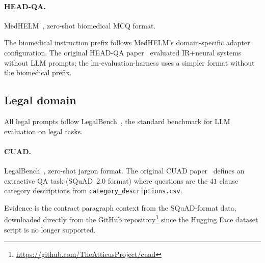 \paragraph{HEAD-QA.}
MedHELM~\cite{bedi2025medhelm}, zero-shot biomedical MCQ format.


The biomedical instruction prefix follows MedHELM's domain-specific
adapter configuration. The original HEAD-QA
paper~\cite{vilares2019headqa} evaluated IR+neural systems without
LLM prompts; the lm-evaluation-harness uses a simpler format without
the biomedical prefix.

\subsection{Legal domain}

All legal prompts follow LegalBench~\cite{guha2023legalbench}, the
standard benchmark for LLM evaluation on legal tasks.

\paragraph{CUAD.}
LegalBench~\cite{guha2023legalbench}, zero-shot jargon format. The
original CUAD paper~\cite{hendrycks2021cuad} defines an extractive QA
task (SQuAD~2.0 format) where questions are the $41$ clause category
descriptions from \texttt{category\_descriptions.csv}.


Evidence is the contract paragraph context from the SQuAD-format
data, downloaded directly from the GitHub
repository\footnote{\url{https://github.com/TheAtticusProject/cuad}}
since the Hugging Face dataset script is no longer supported.

